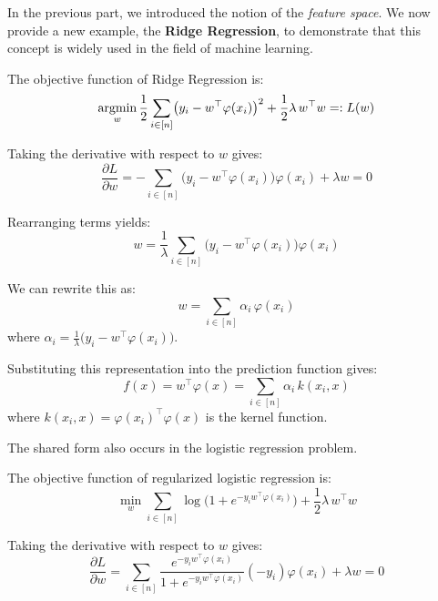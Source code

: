 \documentclass[../main]{subfiles}
\begin{document}
In the previous part, we introduced the notion of the \emph{feature space}.  
We now provide a new example, the \textbf{Ridge Regression}, to demonstrate that this concept is widely used in the field of machine learning.

The objective function of Ridge Regression is:
\begin{equation}
    \mathop{\mathrm{argmin}}_{w} \frac{1}{2}\sum_{i \in [n]} \bigl(y_i - w^\top \varphi(x_i)\bigr)^2 + \frac{1}{2}\lambda\, w^\top w =: L(w)
\end{equation}

Taking the derivative with respect to $w$ gives:
\begin{equation}
    \frac{\partial L}{\partial w}
    = -\sum_{i \in [n]} \bigl(y_i - w^\top \varphi(x_i)\bigr)\varphi(x_i) + \lambda w = 0
\end{equation}

Rearranging terms yields:
\begin{equation}
    w = \frac{1}{\lambda}\sum_{i \in [n]} \bigl(y_i - w^\top \varphi(x_i)\bigr)\varphi(x_i)
\end{equation}

We can rewrite this as:
\begin{equation}
    w = \sum_{i \in [n]} \alpha_i\, \varphi(x_i)
\end{equation}
where $\alpha_i = \frac{1}{\lambda}\bigl(y_i - w^\top \varphi(x_i)\bigr)$.

Substituting this representation into the prediction function gives:
\begin{equation}
    f(x) = w^\top \varphi(x) = \sum_{i \in [n]} \alpha_i\, k(x_i, x)
\end{equation}
where $k(x_i, x) = \varphi(x_i)^\top \varphi(x)$ is the kernel function.

The shared form also occurs in the logistic regression problem.

The objective function of regularized logistic regression is:
\begin{equation}
    \min_{w} \sum_{i \in [n]} \log\bigl(1 + e^{-y_i w^\top \varphi(x_i)}\bigr)
    + \frac{1}{2}\lambda\, w^\top w
\end{equation}

Taking the derivative with respect to $w$ gives:
\begin{equation}
    \frac{\partial L}{\partial w}
    = \sum_{i \in [n]} \frac{e^{-y_i w^\top \varphi(x_i)}}{1 + e^{-y_i w^\top \varphi(x_i)}}(-y_i)\varphi(x_i)
    + \lambda w = 0
\end{equation}
\end{document}
